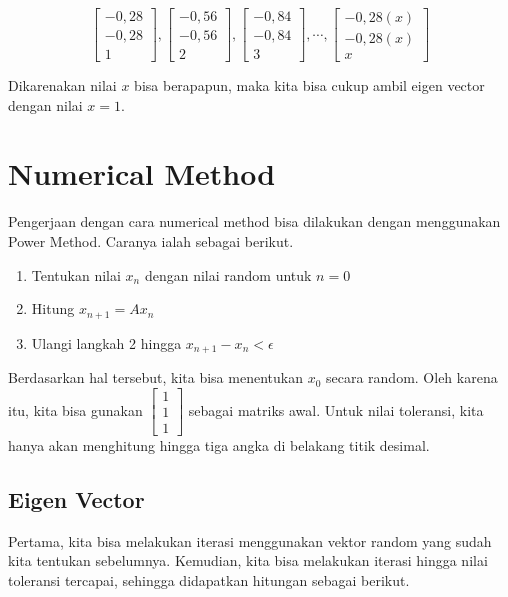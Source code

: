 \documentclass{article}
\begin{document}
$$
\begin{bmatrix}
    -0,28\\
    -0,28\\
    1
\end{bmatrix}
,
\begin{bmatrix}
    -0,56\\
    -0,56\\
    2
\end{bmatrix}
,
\begin{bmatrix}
    -0,84\\
    -0,84\\
    3
\end{bmatrix}
,
\cdots
,
\begin{bmatrix}
    -0,28(x)\\
    -0,28(x)\\
    x
\end{bmatrix}
$$

Dikarenakan nilai $x$ bisa berapapun, maka kita bisa cukup ambil eigen vector dengan nilai $x=1$.

\section{Numerical Method}
Pengerjaan dengan cara numerical method bisa dilakukan dengan menggunakan Power Method. Caranya ialah sebagai berikut.

\begin{enumerate}
    \item Tentukan nilai $x_n$ dengan nilai random untuk $n = 0$
    \item Hitung $x_{n+1} = Ax_n$
    \item Ulangi langkah 2 hingga $x_{n+1} - x_n < \epsilon$
\end{enumerate}

Berdasarkan hal tersebut, kita bisa menentukan $x_0$ secara random. Oleh karena itu, kita bisa gunakan $ \begin{bmatrix} 1  \\ 1  \\ 1  \end{bmatrix} $ sebagai matriks awal. Untuk nilai toleransi, kita hanya akan menghitung hingga tiga angka di belakang titik desimal.

\subsection{Eigen Vector}
Pertama, kita bisa melakukan iterasi menggunakan vektor random yang sudah kita tentukan sebelumnya. Kemudian, kita bisa melakukan iterasi hingga nilai toleransi tercapai, sehingga didapatkan hitungan sebagai berikut.
\end{document}

